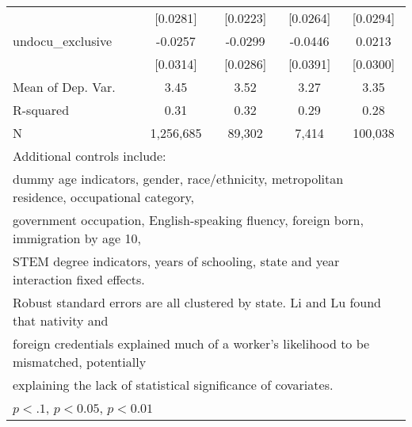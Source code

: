 \begin{table}[htbp]
\begin{tabular}{l*{4}{c}}
                    &    [0.0281]         &    [0.0223]         &    [0.0264]         &    [0.0294]         \\
\addlinespace
undocu\_exclusive    &     -0.0257         &     -0.0299         &     -0.0446         &      0.0213         \\
                    &    [0.0314]         &    [0.0286]         &    [0.0391]         &    [0.0300]         \\
\midrule
Mean of Dep. Var.   &        3.45         &        3.52         &        3.27         &        3.35         \\
R-squared           &        0.31         &        0.32         &        0.29         &        0.28         \\
N                   &   1,256,685         &      89,302         &       7,414         &     100,038         \\
\bottomrule
\multicolumn{5}{l}{\footnotesize Additional controls include:}\\
\multicolumn{5}{l}{\footnotesize dummy age indicators, gender, race/ethnicity, metropolitan residence, occupational category,}\\
\multicolumn{5}{l}{\footnotesize government occupation, English-speaking fluency, foreign born, immigration by age 10,}\\
\multicolumn{5}{l}{\footnotesize STEM degree indicators, years of schooling, state and year interaction fixed effects.}\\
\multicolumn{5}{l}{\footnotesize Robust standard errors are all clustered by state. Li and Lu found that nativity and}\\
\multicolumn{5}{l}{\footnotesize foreign credentials explained much of a worker's likelihood to be mismatched, potentially}\\
\multicolumn{5}{l}{\footnotesize explaining the lack of statistical significance of covariates.}\\
\multicolumn{5}{l}{\footnotesize \sym{*} \(p<.1\), \sym{**} \(p<0.05\), \sym{***} \(p<0.01\)}\\
\end{tabular}
\end{table}
